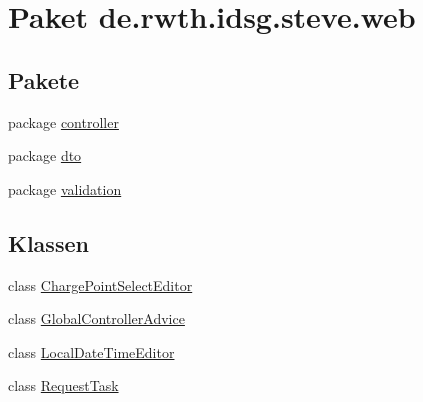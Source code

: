 \hypertarget{namespacede_1_1rwth_1_1idsg_1_1steve_1_1web}{\section{Paket de.\-rwth.\-idsg.\-steve.\-web}
\label{namespacede_1_1rwth_1_1idsg_1_1steve_1_1web}
}
\subsection*{Pakete}
\begin{DoxyCompactItemize}
\item 
package \hyperlink{namespacede_1_1rwth_1_1idsg_1_1steve_1_1web_1_1controller}{controller}
\item 
package \hyperlink{namespacede_1_1rwth_1_1idsg_1_1steve_1_1web_1_1dto}{dto}
\item 
package \hyperlink{namespacede_1_1rwth_1_1idsg_1_1steve_1_1web_1_1validation}{validation}
\end{DoxyCompactItemize}
\subsection*{Klassen}
\begin{DoxyCompactItemize}
\item 
class \hyperlink{classde_1_1rwth_1_1idsg_1_1steve_1_1web_1_1_charge_point_select_editor}{Charge\-Point\-Select\-Editor}
\item 
class \hyperlink{classde_1_1rwth_1_1idsg_1_1steve_1_1web_1_1_global_controller_advice}{Global\-Controller\-Advice}
\item 
class \hyperlink{classde_1_1rwth_1_1idsg_1_1steve_1_1web_1_1_local_date_time_editor}{Local\-Date\-Time\-Editor}
\item 
class \hyperlink{classde_1_1rwth_1_1idsg_1_1steve_1_1web_1_1_request_task}{Request\-Task}
\end{DoxyCompactItemize}
